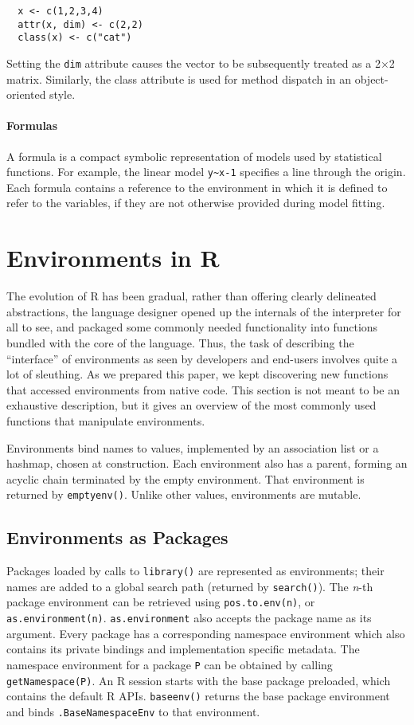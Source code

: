 \documentclass[10pt,review,sigplan,authorversion=true]{acmart}
\newcommand{\code}[1]{\lstinline |#1|\xspace}
\newcommand{\asEnvironment}{\code{as.environment}}
\begin{document}
\begin{lstlisting}
  x <- c(1,2,3,4)
  attr(x, dim) <- c(2,2)
  class(x) <- c("cat")
\end{lstlisting}

Setting the \code{dim} attribute causes the vector to be subsequently treated as
a 2$\times$2 matrix. Similarly, the class attribute is used for method dispatch
in an object-oriented style.

\paragraph{Formulas}  A formula is a compact symbolic representation of models
used by statistical functions. For example, the linear model \code{y~x-1}
specifies a line through the origin. Each formula contains a reference to the
environment in which it is defined to refer to the variables, if they are not
otherwise provided during model fitting.



\section{Environments in R}

The evolution of R has been gradual, rather than offering clearly delineated
abstractions, the language designer opened up the internals of the interpreter
for all to see, and packaged some commonly needed functionality into functions
bundled with the core of the language. Thus, the task of describing the
``interface'' of environments as seen by developers and end-users involves quite
a lot of sleuthing. As we prepared this paper, we kept discovering new functions
that accessed environments from native code. This section is not meant to be an
exhaustive description, but it gives an overview of the most commonly used
functions that manipulate environments.

Environments bind names to values, implemented by an association list or a
hashmap, chosen at construction. Each environment also has a parent, forming an
acyclic chain terminated by the empty environment. That environment is returned
by \code{emptyenv()}. Unlike other values, environments are mutable.

\subsection{Environments as Packages}

Packages loaded by calls to \code{library()} are represented as environments;
their names are added to a global search path (returned by \code{search()}). The
\emph{n}-th package environment can be retrieved using \code{pos.to.env(n)}, or
\code{as.environment(n)}. \asEnvironment also accepts the package name as its
argument. Every package has a corresponding namespace environment which also
contains its private bindings and implementation specific metadata. The
namespace environment for a package \code{P} can be obtained by calling
\code{getNamespace(P)}. An R session starts with the base package preloaded,
which contains the default R APIs. \code{baseenv()} returns the base package
environment and binds \code{.BaseNamespaceEnv} to that environment.
\end{document}
